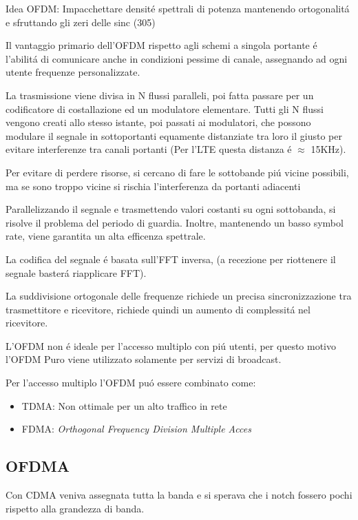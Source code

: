 \documentclass{article}
\begin{document}
Idea OFDM: Impacchettare densit\'e spettrali di potenza mantenendo ortogonalit\'a e sfruttando gli zeri delle sinc (305)

Il vantaggio primario dell'OFDM rispetto agli schemi a singola portante \'e l'abilit\'a di comunicare anche in condizioni pessime di canale, assegnando ad ogni utente frequenze personalizzate.

La trasmissione viene divisa in N flussi paralleli, poi fatta passare per un codificatore di costallazione ed un modulatore elementare.
Tutti gli N flussi vengono creati allo stesso istante, poi passati ai modulatori, che possono modulare il segnale in sottoportanti equamente distanziate tra loro il giusto per evitare interferenze tra canali portanti (Per l'LTE questa distanza \'e $\approx$ 15KHz).

Per evitare di perdere risorse, si cercano di fare le sottobande pi\'u vicine possibili, ma se sono troppo vicine si rischia l'interferenza da portanti adiacenti

Parallelizzando il segnale e trasmettendo valori costanti su ogni sottobanda, si risolve il problema del periodo di guardia. Inoltre, mantenendo un basso symbol rate, viene garantita un alta efficenza spettrale.

La codifica del segnale \'e basata sull'FFT inversa, (a recezione per riottenere il segnale baster\'a riapplicare FFT).

La suddivisione ortogonale delle frequenze richiede un precisa sincronizzazione tra trasmettitore e ricevitore, richiede quindi un aumento di complessit\'a nel ricevitore.

L'OFDM non \'e ideale per l'accesso multiplo con pi\'u utenti, per questo motivo l'OFDM Puro viene utilizzato solamente per servizi di broadcast.

Per l'accesso multiplo l'OFDM pu\'o essere combinato come:
\begin{itemize}
    \item TDMA: Non ottimale per un alto traffico in rete
    \item FDMA: \textit{Orthogonal Frequency Division Multiple Acces}
\end{itemize}

\subsection{OFDMA}

Con CDMA veniva assegnata tutta la banda e si sperava che i notch fossero pochi rispetto alla grandezza di banda.
\end{document}
